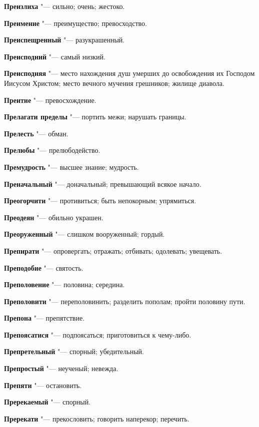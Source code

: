 \begin{mymulticols}
\noindent\textbf{Преизлиха} "--- сильно; очень; жестоко. 

\noindent\textbf{Преимение} "--- преимущество; превосходство. 

\noindent\textbf{Преиспещренный} "--- разукрашенный. 

\noindent\textbf{Преисподний} "--- самый низкий. 

\noindent\textbf{Преисподняя} "--- место нахождения душ умерших до освобождения их Господом Иисусом Христом; место вечного мучения грешников; жилище диавола. 

\noindent\textbf{Преитие} "--- превосхождение. 

\noindent\textbf{Прелагати пределы} "--- портить межи; нарушать границы. 

\noindent\textbf{Прелесть} "--- обман. 

\noindent\textbf{Прелюбы} "--- прелюбодейство. 

\noindent\textbf{Премудрость} "--- высшее знание; мудрость. 

\noindent\textbf{Преначальный} "--- доначальный; превышающий всякое начало. 

\noindent\textbf{Преогорчити} "--- противиться; быть непокорным; упрямиться. 

\noindent\textbf{Преодеян} "--- обильно украшен. 

\noindent\textbf{Преоруженный} "--- слишком вооруженный; гордый. 

\noindent\textbf{Препирати} "--- опровергать; отражать; отбивать; одолевать; увещевать. 

\noindent\textbf{Преподобие} "--- святость. 

\noindent\textbf{Преполовение} "--- половина; середина. 

\noindent\textbf{Преполовити} "--- переполовинить; разделить пополам; пройти половину пути. 

\noindent\textbf{Препона} "--- препятствие. 

\noindent\textbf{Препоясатися} "--- подпоясаться; приготовиться к чему-либо. 

\noindent\textbf{Препретельный} "--- спорный; убедительный. 

\noindent\textbf{Препростый} "--- неученый; невежда. 

\noindent\textbf{Препяти} "--- остановить. 

\noindent\textbf{Пререкаемый} "--- спорный. 

\noindent\textbf{Пререкати} "--- прекословить; говорить наперекор; перечить. 


\end{mymulticols}
